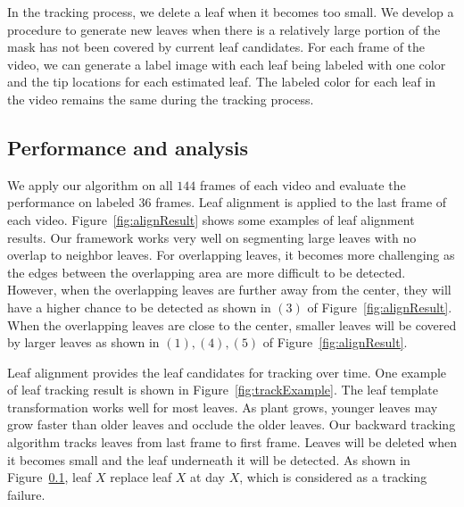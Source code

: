 In the tracking process, we delete a leaf when it becomes too small. 
We develop a procedure to generate new leaves when there is a relatively large portion of the mask has not been covered by current leaf candidates.
For each frame of the video, we can generate a label image with each leaf being labeled with one color and the tip locations for each estimated leaf.
The labeled color for each leaf in the video remains the same during the tracking process.



\subsection{Performance and analysis}
We apply our algorithm on all $144$ frames of each video and evaluate the performance on labeled $36$ frames.
Leaf alignment is applied to the last frame of each video. 
Figure~\ref{fig:alignResult} shows some examples of leaf alignment results. 
Our framework works very well on segmenting large leaves with no overlap to neighbor leaves. 
For overlapping leaves, it becomes more challenging as the edges between the overlapping area are more difficult to be detected. 
However, when the overlapping leaves are further away from the center, they will have a higher chance to be detected as shown in $(3)$ of Figure~\ref{fig:alignResult}. 
When the overlapping leaves are close to the center, smaller leaves will be covered by larger leaves as shown in $(1), (4), (5)$ of Figure~\ref{fig:alignResult}.


Leaf alignment provides the leaf candidates for tracking over time. 
One example of leaf tracking result is shown in Figure~\ref{fig:trackExample}. 
The leaf template transformation works well for most leaves. 
As plant grows, younger leaves may grow faster than older leaves and occlude the older leaves. 
Our backward tracking algorithm tracks leaves from last frame to first frame. 
Leaves will be deleted when it becomes small and the leaf underneath it will be detected. 
As shown in Figure~\ref{}, leaf $X$ replace leaf $X$ at day $X$, which is considered as a tracking failure. 




